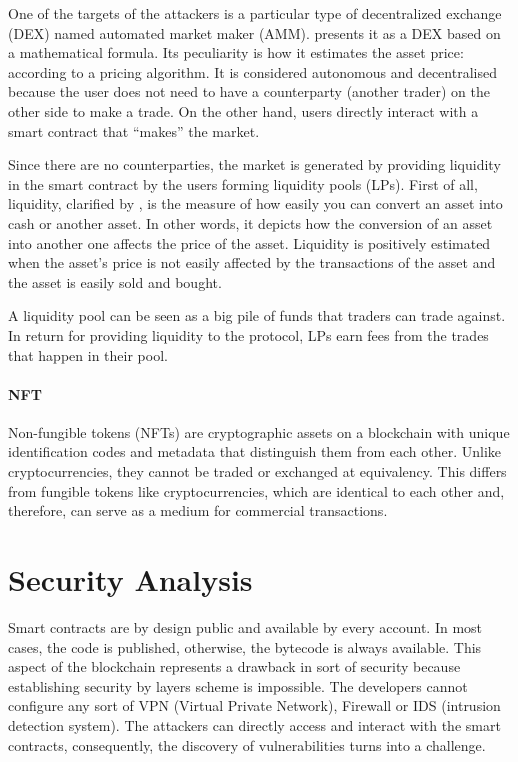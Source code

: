 One of the targets of the attackers is a particular type of decentralized exchange (DEX) named automated market maker (AMM). 
\citet{AMMDef} presents it as a DEX based on a mathematical formula. Its peculiarity is how it estimates the asset price: according to a pricing algorithm.
It is considered autonomous and decentralised because the user does not need to have a counterparty (another trader) on the other side to make a trade. 
On the other hand, users directly interact with a smart contract that “makes” the market.

Since there are no counterparties, the market is generated by providing liquidity in the smart contract by the users forming liquidity pools (LPs).
First of all, liquidity, clarified by \citet{LiquidityDef}, is the measure of how easily you can convert an asset into cash or another asset. 
In other words, it depicts how the conversion of an asset into another one affects the price of the asset.
Liquidity is positively estimated when the asset's price is not easily affected by the transactions of the asset and the asset is easily sold and bought. 

A liquidity pool can be seen as a big pile of funds that traders can trade against. 
In return for providing liquidity to the protocol, LPs earn fees from the trades that happen in their pool.

\paragraph{NFT} Non-fungible tokens (NFTs) are cryptographic assets on a blockchain with unique identification codes and metadata that distinguish them from each other.
Unlike cryptocurrencies, they cannot be traded or exchanged at equivalency. 
This differs from fungible tokens like cryptocurrencies, which are identical to each other and, therefore, can serve as a medium for commercial transactions. 



\section{Security Analysis}
\label{sec:Backgroud:SecurityAnalysis}

Smart contracts are by design public and available by every account. 
In most cases, the code is published, otherwise, the bytecode is always available.
This aspect of the blockchain represents a drawback in sort of security because establishing security by layers scheme is impossible.
The developers cannot configure any sort of VPN (Virtual Private Network), Firewall or IDS (intrusion detection system). 
The attackers can directly access and interact with the smart contracts, consequently, the discovery of vulnerabilities turns into a challenge.

